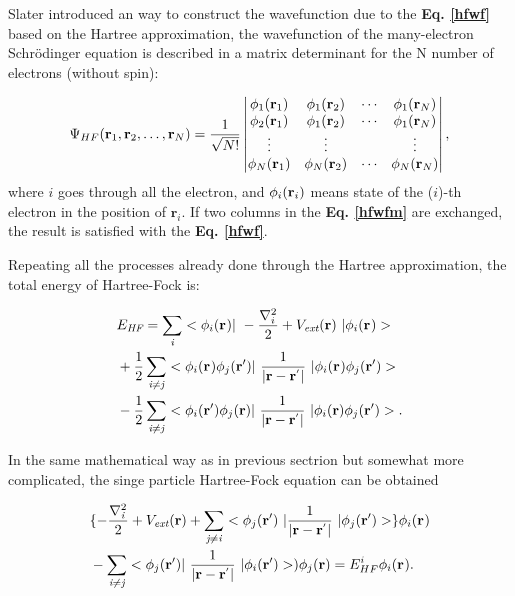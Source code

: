 \documentclass[a4paper, 12pt, titlepage,oneside,drop]{kthesis}
\begin{document}
Slater introduced an way to construct the wavefunction due to the \textbf{Eq. \ref{hfwf}} based on the Hartree approximation, 
the wavefunction of the many-electron Schrödinger equation is described in a matrix determinant for the N number of electrons 
(without spin):

\begin{equation}\label{hfwfm}
\Psi_{HF}(\mathbf{r}_1, \mathbf{r}_2, \ldots, \mathbf{r}_N) =
\frac{1}{\sqrt{N!}} \left|
\begin{matrix}
    \bwf<1><1> & \bwf<1><2> & \cdots & \bwf<1><N> \\
    \bwf<2><1> & \bwf<1><2> & \cdots & \bwf<1><N> \\
    \vdots               & \vdots               &        & \vdots               \\
    \bwf<N><1> & \bwf<N><2> & \cdots & \bwf<N><N>
\end{matrix} \right|,
\end{equation}
\noindent where $i$ goes through all the electron, and $\bwf<i><i>$ means state of the ($i$)-th electron in the position of $\textbf{r}_\textit{i}$. If two columns in the \textbf{Eq. \ref{hfwfm}} are exchanged, 
the result is satisfied with the \textbf{Eq. \ref{hfwf}}.

Repeating all the processes already done through the Hartree approximation, the total energy of Hartree-Fock is:

\begin{equation}\begin{split}
&E_\textit{HF} = \sumi<i> <\bwf<i><> |\ -\frac{\nabla^{2}_{i}}{2} + V_\textit{ext}(\textbf{r})  \ | \bwf<i><> > \\
& + \frac{1}{2} \suminj<i><j> <\bwf<i><> \bwfn<j><'>|\ \frac{1}{|\textbf{r} - \textbf{r}^{'} |} \ | \bwf<i><> \bwfn<j><'>> \\
& - \frac{1}{2} \suminj<i><j> <\bwfn<i><'> \bwfn<j><>|\ \frac{1}{|\textbf{r} - \textbf{r}^{'} |} \ | \bwfn<i><> \bwfn<j><'>>.
\end{split}\end{equation}

In the same mathematical way as in previous sectrion but somewhat more complicated, the singe particle Hartree-Fock equation can be obtained

\begin{equation}\begin{split}\label{above1}
& \{ -\frac{\nabla^{2}_{\textit i}}{2} + V_\textit{ext}(\textbf{r})+ \suminj<j><i> <\bwfn<j><'>\ | \frac{1}{|\textbf{r} - \textbf{r}^{'} |} \ | \bwfn<j><'>> \} \bwf<i><>  \\
& - \suminj<i><j>  < \bwfn<j><'>|\ \frac{1}{|\textbf{r} - \textbf{r}^{'} |} \ | \bwfn<i><'> >) \bwfn<j><>  = E^{i}_{HF} \bwf<i><>.
\end{split}\end{equation}
\end{document}
